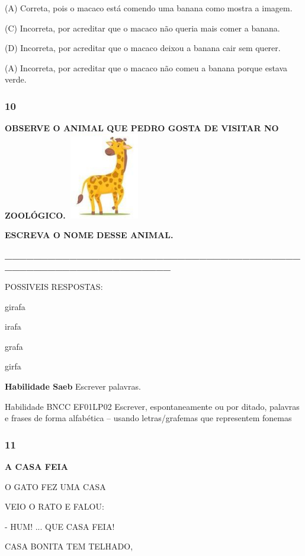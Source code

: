 \begin{escola}
(A) Correta, pois o macaco está comendo uma banana como mostra a imagem.

(C) Incorreta, por acreditar que o macaco não queria mais comer a
banana.

(D) Incorreta, por acreditar que o macaco deixou a banana cair sem
querer.

(A) Incorreta, por acreditar que o macaco não comeu a banana porque
estava verde.

\subsubsection{10}\label{section-50}

\textbf{OBSERVE O ANIMAL QUE PEDRO GOSTA DE VISITAR NO
ZOOLÓGICO.}\includegraphics[width=1.36806in,height=1.47778in]{media/image219.jpg}

\textbf{ESCREVA O NOME DESSE ANIMAL.}

\textbf{\_\_\_\_\_\_\_\_\_\_\_\_\_\_\_\_\_\_\_\_\_\_\_\_\_\_\_\_\_\_\_\_\_\_\_\_\_\_\_\_\_\_\_\_\_\_\_\_\_\_\_\_\_\_\_\_\_\_\_\_\_\_\_\_}

POSSIVEIS RESPOSTAS:

girafa

irafa

grafa

girfa

\textbf{Habilidade Saeb} Escrever palavras.

Habilidade BNCC EF01LP02 Escrever, espontaneamente ou por ditado,
palavras e frases de forma alfabética -- usando letras/grafemas que
representem fonemas

\subsubsection{11}\label{section-51}

\textbf{A CASA FEIA}

O GATO FEZ UMA CASA

VEIO O RATO E FALOU:

- HUM! ... QUE CASA FEIA!

CASA BONITA TEM TELHADO,


\end{escola}
